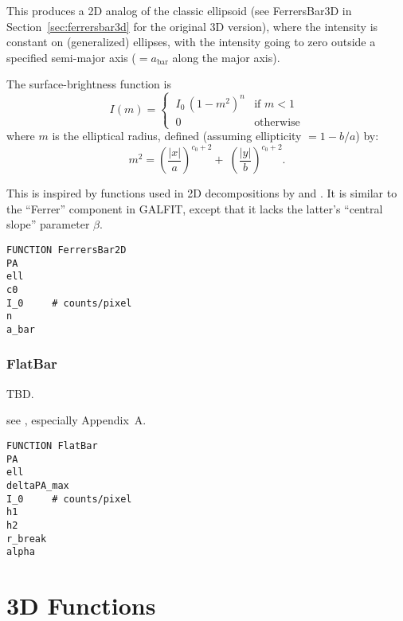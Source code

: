 \documentclass[10pt,a4paper,article]{memoir}
\begin{document}
This produces a 2D analog of the classic \citet{ferrers} ellipsoid (see
FerrersBar3D in Section~\ref{sec:ferrersbar3d} for the original 3D
version), where the intensity is constant on (generalized) ellipses,
with the intensity going to zero outside a specified semi-major axis ($=
a_{\mathrm{bar}}$ along the major axis).

The surface-brightness function is
\begin{equation}\label{eqn:ferrers2d}
 I(m) = 
  \begin{cases} 
   \: I_0 \, (1 - m^{2})^{n} & \text{if } m < 1 \\
   \: 0                      & \text{otherwise}
  \end{cases}
\end{equation}
where $m$ is the elliptical radius, defined (assuming ellipticity $= 1
- b/a$) by:
\begin{equation}
m^{2} =  \left( \frac{|x|}{a} \right)^{c_{0} + 2} \! \! + \; \left( \frac{|y|}{b} \right)^{c_{0} + 2} .
\end{equation}


This is inspired by functions used in 2D decompositions by \citet{laurikainen05}
and \citet{aguerri09}. It is similar to the ``Ferrer'' component in
GALFIT, except that it lacks the latter's ``central slope'' parameter $\beta$.

\begin{verbatim}
FUNCTION FerrersBar2D
PA
ell
c0
I_0     # counts/pixel
n
a_bar
\end{verbatim}


\subsubsection{FlatBar}

TBD.

see \cite{erwin21}, especially Appendix~A.

\begin{verbatim}
FUNCTION FlatBar
PA
ell
deltaPA_max
I_0     # counts/pixel
h1
h2
r_break
alpha
\end{verbatim}





\section{3D Functions}
\end{document}

